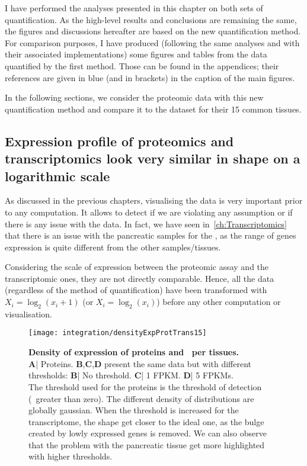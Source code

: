 I have performed the analyses presented in this chapter on both sets of
quantification. As the high-level results and conclusions are remaining the same,
the figures and discussions hereafter are based on
the new quantification method. For comparison purposes,
I have produced (following the same analyses and with their associated
implementations) some figures and tables from the data quantified by the first
method. Those can be found in the appendices; their references
are given in blue (and in brackets) in the caption of the main figures.

In the following sections, we consider the proteomic data with this new
quantification method and compare it to the  dataset
for their 15 common tissues.

\subsection{Expression profile of proteomics and transcriptomics look very
similar in shape on a logarithmic scale}\label{subsec:IntegrationExpProfileSim}

As discussed in the previous chapters, visualising the data is very important
prior to any computation. It allows to detect if we are violating
any assumption or if there is any issue with the data. In fact, we have seen
in~\cref{ch:Transcriptomics} that there is an issue with the pancreatic
samples for the , as the range of genes expression is quite
different from the other samples/tissues.

Considering the scale of expression between the proteomic assay and the
transcriptomic ones, they are not directly comparable. Hence,
all the data (regardless of the method of quantification) have been transformed
with $X_{i}=\log_{2} (x_{i}+1)$ (or $X_{i}=\log_{2} (x_{i})$)
before any other computation or visualisation.


\begin{figure}[!htbp]
    \texttt{[image: integration/densityExpProtTrans15]}\centering
    \caption[Density of expression of proteins and \mRNAs\ per
    tissues.]
    {\label{fig:densityExpProtTrans15}\textbf{Density of expression of
    proteins and \mRNAs\ per tissues.} \\\textbf{A}| Proteins.
    \textbf{B},\textbf{C},\textbf{D} present the same data but with
    different thresholds:
    \textbf{B}| No threshold. \textbf{C}| 1 \gls{FPKM}.
    \textbf{D}| 5 \glspl{FPKM}.\\The threshold used for the proteins is the
    threshold of
    detection (\ie\ greater than zero). The different density of distributions are
    globally gaussian. When the threshold is increased for the transcriptome, the
    shape get closer to the ideal one, as the bulge created by lowly expressed
    genes is removed. We can also observe that the problem with the pancreatic
    tissue get more highlighted with higher thresholds.}
\end{figure}

